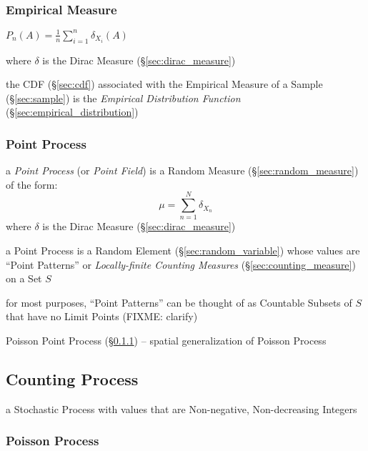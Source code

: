 \subsubsection{Empirical Measure}\label{sec:empirical_measure}

$P_n(A) = \frac{1}{n}\sum_{i=1}^n \delta_{X_i}(A)$

where $\delta$ is the Dirac Measure (\S\ref{sec:dirac_measure})

the CDF (\S\ref{sec:cdf}) associated with the Empirical Measure of a Sample
(\S\ref{sec:sample}) is the \emph{Empirical Distribution Function}
(\S\ref{sec:empirical_distribution})



\subsubsection{Point Process}\label{sec:point_process}

a \emph{Point Process} (or \emph{Point Field}) is a Random Measure
(\S\ref{sec:random_measure}) of the form:
\[
  \mu = \sum_{n=1}^N \delta_{X_n}
\]
where $\delta$ is the Dirac Measure (\S\ref{sec:dirac_measure})

a Point Process is a Random Element (\S\ref{sec:random_variable}) whose values
are ``Point Patterns'' or \emph{Locally-finite Counting Measures}
(\S\ref{sec:counting_measure}) on a Set $S$

for most purposes, ``Point Patterns'' can be thought of as Countable Subsets of
$S$ that have no Limit Points (FIXME: clarify)

Poisson Point Process (\S\ref{sec:poisson_process}) -- spatial generalization of
Poisson Process



\subsection{Counting Process}\label{sec:counting_process}

a Stochastic Process with values that are Non-negative, Non-decreasing Integers



\subsubsection{Poisson Process}\label{sec:poisson_process}

